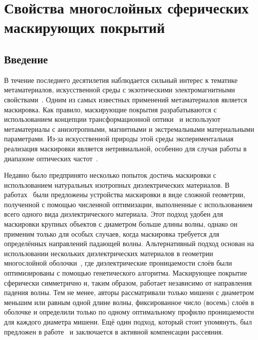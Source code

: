 \chapter{Свойства многослойных сферических маскирующих
  покрытий} \label{chapt3}
\section{Введение}
В течение последнего десятилетия наблюдается сильный интерес к
тематике метаматериалов, искусственной среды с экзотическими
электромагнитными свойствами~\cite{Smith-2004,
  Schurig-2006, Shalaev-2007, Kivshar-2012}. Одним из самых известных
применений метаматериалов является маскировка. Как правило,
маскирующие покрытия разрабатываются с использованием концепции
трансформационной оптики~\cite{pendry_TO, Leonhardt-2006} и
используют метаматериалы с анизотропными, магнитными и экстремальными
материальными параметрами. Из-за искусственной природы этой среды
экспериментальная реализация маскировки является нетривиальной,
особенно для случая работы в диапазоне оптических
частот~\cite{Kildishev:2011, alu, XU-Su:120408, Alu-2005}. 

Недавно было предпринято несколько попыток достичь маскировки с
использованием натуральных изотропных диэлектрических материалов. В
работах~\cite{Sigmund-AllDiel-2011, smith-3dprinterCloak-2013,
  Fujii_topolOpti_theory_2013,
  ma-experiment-topology-2013,LayeredShell,MOP:MOP27024} были
предложены устройства маскировки в виде сложной геометрии, полученной
с помощью численной оптимизации, выполненные с использованием всего
одного вида диэлектрического материала.  Этот подход удобен для
маскировки крупных объектов с диаметром больше длины волны, однако он
применим только для особых случаев, когда маскировка требуется для
определённых направлений падающей волны. Альтернативный подход основан
на использовании нескольких диэлектрических материалов в геометрии
многослойной оболочки~\cite{Semouchkina-2013, semouchkina2}, где
диэлектрические проницаемости слоёв были оптимизированы с помощью
генетического алгоритма. Маскирующее покрытие сферически симметрично
и, таким образом, работает независимо от направления падения
волны. Тем не менее, авторы рассматривали только мишени с диаметром
меньшим или равным одной длине волны, фиксированное число (восемь)
слоёв в оболочке и определили только по одному оптимальному профилю
проницаемости для каждого диаметра мишени.  Ещё один подход, который
стоит упомянуть, был предложен в
работе~\cite{Elefteriades_ActiveCloak_2013} и заключается в активной
компенсации рассеяния.

